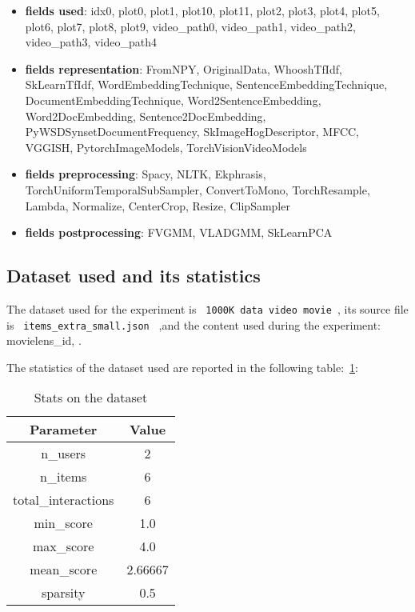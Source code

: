 \documentclass[11pt]{article}
\begin{document}
\begin{itemize}
    \item \textbf{fields used}:  idx0, plot0, plot1, plot10, plot11, plot2, plot3, plot4, plot5, plot6, plot7, plot8, plot9, video\_path0, video\_path1, video\_path2, video\_path3, video\_path4

    \item \textbf{fields representation}:  FromNPY, OriginalData, WhooshTfIdf, SkLearnTfIdf, WordEmbeddingTechnique, SentenceEmbeddingTechnique, DocumentEmbeddingTechnique, Word2SentenceEmbedding, Word2DocEmbedding, Sentence2DocEmbedding, PyWSDSynsetDocumentFrequency, SkImageHogDescriptor, MFCC, VGGISH, PytorchImageModels, TorchVisionVideoModels

    \item \textbf{fields preprocessing}:  Spacy, NLTK, Ekphrasis, TorchUniformTemporalSubSampler, ConvertToMono, TorchResample, Lambda, Normalize, CenterCrop, Resize, ClipSampler

    \item \textbf{fields postprocessing}:  FVGMM, VLADGMM, SkLearnPCA
\end{itemize}





\hfill\break
\subsection{Dataset used and its statistics}
The dataset used for the experiment is  \lstinline[style=verbatim-text]| 1000K data video movie |,
its source file is \lstinline[style=verbatim-text]| items_extra_small.json | ,and the content used during the experiment:
     movielens\_id,
.


The statistics of the dataset used are reported in the following table:~\ref{tab:dataset_table}:
\begin{table}[ht]
    \centering
  \begin{tabular}{|c|c|}
    \hline
    \textbf{Parameter}& \textbf{Value} \\ \hline
    n\_users  & 2\\ \hline
    n\_items  & 6\\ \hline
    total\_interactions  & 6\\ \hline
    min\_score  & 1.0\\ \hline
    max\_score  & 4.0\\ \hline
    mean\_score  & 2.66667\\ \hline
    sparsity  & 0.5\\ \hline
  \end{tabular}
   \caption{Stats on the dataset}\label{tab:dataset_table}
\end{table}
\end{document}
